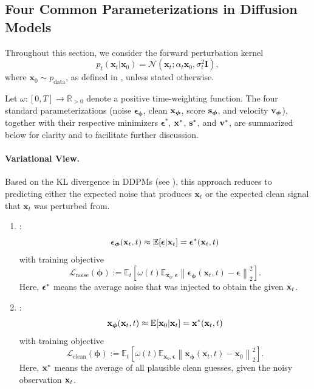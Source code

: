\subsection{Four Common Parameterizations in Diffusion Models}\label{subsec:four-predictions}
Throughout this section, we consider the forward perturbation kernel
\[
p_t(\mathbf{x}_t|\mathbf{x}_0) = \mathcal{N}\left(\mathbf{x}_t; \alpha_t \mathbf{x}_0, \sigma_t^2 \mathbf{I} \right),
\]
where $\mathbf{x}_0 \sim p_{\mathrm{data}}$, as defined in , unless stated otherwise.



Let $\omega: [0, T] \to \mathbb{R}_{>0}$ denote a positive time-weighting function.  
The four standard parameterizations (noise $\bm{\epsilon}_{\bm{\phi}}$, clean ${\mathbf{x}}_{\bm{\phi}}$, score ${\mathbf{s}}_{\bm{\phi}}$, and velocity ${\mathbf{v}}_{\bm{\phi}}$), together with their respective minimizers $\bm{\epsilon}^*$, ${\mathbf{x}}^*$, ${\mathbf{s}}^*$, and ${\mathbf{v}}^*$, are summarized below for clarity and to facilitate further discussion.

\paragraph{Variational View.} Based on the KL divergence in DDPMs (see ), this approach reduces to predicting either the expected noise that produces $\mathbf{x}_t$ or the expected clean signal that $\mathbf{x}_t$ was perturbed from.
\begin{enumerate}
    \item {} \citep{ho2020denoising}:
    \begin{equation}\label{eq:noise-def}
        \bm{\epsilon}_{\bm{\phi}}(\mathbf{x}_t,t) \approx \mathbb{E}[\bm{\epsilon}|\mathbf{x}_t]=\bm{\epsilon}^*({\mathbf{x}}_t, t)
    \end{equation}
    with training objective
    \[
        \mathcal{L}_{\text{noise}}(\bm{\phi}) := \mathbb{E}_t \left[\omega(t) \mathbb{E}_{\mathbf{x}_0, \bm{\epsilon}} \left\| \bm{\epsilon}_{\bm{\phi}}(\mathbf{x}_t,t) - \bm{\epsilon} \right\|_2^2 \right].
    \]
    Here, ${\bm{\epsilon}}^*$ means the average noise that was injected to obtain the given ${\mathbf{x}}_t$.

    \item {} \citep{kingma2021variational,karras2022elucidating,song2023consistency}:
    \begin{equation}\label{eq:clean-def}
        \mathbf{x}_{\bm{\phi}}(\mathbf{x}_t,t) \approx \mathbb{E}[\mathbf{x}_0|\mathbf{x}_t]={\mathbf{x}}^*({\mathbf{x}}_t, t)
    \end{equation}
    with training objective
    \[
        \mathcal{L}_{\text{clean}}(\bm{\phi}) := \mathbb{E}_t \left[\omega(t) \mathbb{E}_{\mathbf{x}_0, \bm{\epsilon}} \left\| \mathbf{x}_{\bm{\phi}}(\mathbf{x}_t,t) - \mathbf{x}_0 \right\|_2^2 \right].
    \]
    Here, ${\mathbf{x}}^*$ means the average of all plausible clean guesses, given the noisy observation ${\mathbf{x}}_t$.
\end{enumerate}

